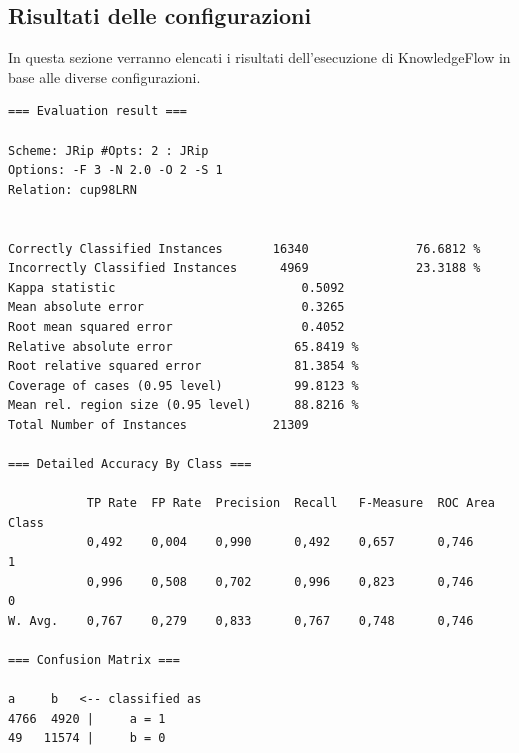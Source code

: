 


\subsection{Risultati delle configurazioni}
In questa sezione verranno elencati i risultati dell'esecuzione di KnowledgeFlow in base alle diverse configurazioni. \newline

\vspace{0.3cm}
\begin{mdframed}[frametitle=JRip con 2 passate successive di ottimizzazione]
\begin{verbatim}
=== Evaluation result ===

Scheme: JRip #Opts: 2 : JRip
Options: -F 3 -N 2.0 -O 2 -S 1
Relation: cup98LRN


Correctly Classified Instances       16340               76.6812 %
Incorrectly Classified Instances      4969               23.3188 %
Kappa statistic                          0.5092
Mean absolute error                      0.3265
Root mean squared error                  0.4052
Relative absolute error                 65.8419 %
Root relative squared error             81.3854 %
Coverage of cases (0.95 level)          99.8123 %
Mean rel. region size (0.95 level)      88.8216 %
Total Number of Instances            21309     

=== Detailed Accuracy By Class ===

           TP Rate  FP Rate  Precision  Recall   F-Measure  ROC Area  Class
           0,492    0,004    0,990      0,492    0,657      0,746     1
           0,996    0,508    0,702      0,996    0,823      0,746     0
W. Avg.    0,767    0,279    0,833      0,767    0,748      0,746          

=== Confusion Matrix ===

a     b   <-- classified as
4766  4920 |     a = 1
49   11574 |     b = 0
\end{verbatim}
\end{mdframed}

